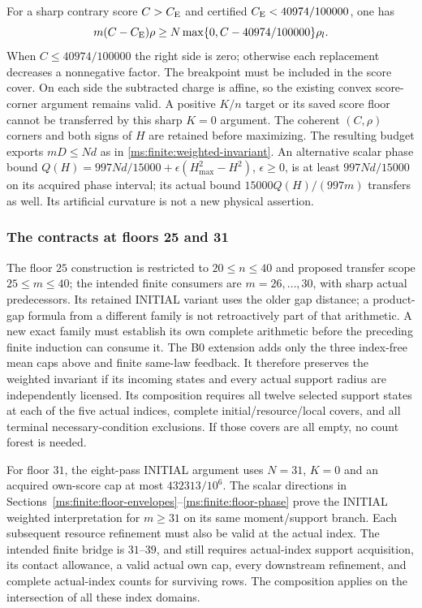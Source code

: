 For a sharp contrary score $C>C_{\mathrm E}$ and certified
$C_{\mathrm E}<40974/100000$, one has
\[
 m(C-C_{\mathrm E})\rho\ge N\max\{0,C-40974/100000\}\rho_l.
\]
When $C\le40974/100000$ the right side is zero; otherwise each
replacement decreases a nonnegative factor. The breakpoint must be
included in the score cover. On each side the subtracted charge is affine,
so the existing convex score-corner argument remains valid. A positive
$K/n$ target or its saved score floor cannot be transferred by this sharp
$K=0$ argument. The coherent $(C,\rho)$ corners and both signs of $H$
are retained before maximizing. The resulting budget exports
$mD\le Nd$ as in \eqref{ms:finite:weighted-invariant}.
An alternative scalar phase bound
$Q(H)=997Nd/15000+\epsilon(H_{\max}^2-H^2)$, $\epsilon\ge0$,
is at least $997Nd/15000$ on its acquired phase interval; its actual
bound $15000Q(H)/(997m)$ transfers as well. Its artificial curvature
is not a new physical assertion.

\subsubsection{The contracts at floors 25 and 31}
\label{ms:finite:floor25-31}
The floor $25$ construction is restricted to
$20\le n\le40$ and proposed transfer scope $25\le m\le40$;
the intended finite consumers are $m=26,\ldots,30$, with sharp actual
predecessors. Its retained INITIAL variant uses the older gap distance;
a product-gap formula from a different family is not retroactively part of
that arithmetic. A new exact family must establish its own complete arithmetic
before the preceding finite induction can consume it.
The B0 extension adds only the three index-free mean caps above and finite
same-law feedback. It therefore preserves the weighted invariant if its
incoming states and every actual support radius are independently licensed.
Its composition requires all twelve selected support states at each
of the five actual indices, complete initial/resource/local covers, and all
terminal necessary-condition exclusions. If those covers are all empty,
no count forest is needed.

For floor $31$, the eight-pass INITIAL argument uses $N=31$, $K=0$ and
an acquired own-score cap at most $432313/10^6$. The scalar directions in
Sections~\ref{ms:finite:floor-envelopes}--\ref{ms:finite:floor-phase}
prove the INITIAL weighted interpretation for $m\ge31$ on its same
moment/support branch. Each subsequent resource refinement must also
be valid at the actual index.
The intended finite bridge is $31$--$39$, and still requires actual-index
support acquisition, its contact allowance, a valid actual own cap, every
downstream refinement, and complete actual-index counts for surviving rows.
The composition applies on the intersection of all these index domains.

